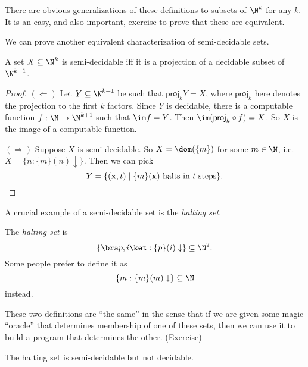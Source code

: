 \documentclass[a4paper]{article}
\newcommand\proj{\mathsf{proj}}
\begin{document}
There are obvious generalizations of these definitions to subsets of $\N^k$ for any $k$. It is an easy, and also important, exercise to prove that these are equivalent.

We can prove another equivalent characterization of semi-decidable sets.
\begin{prop}
  A set $X \subseteq \N^k$ is semi-decidable iff it is a projection of a decidable subset of $\N^{k + 1}$.
\end{prop}

\begin{proof}
  $(\Leftarrow)$ Let $Y \subseteq \N^{k + 1}$ be such that $\proj_k Y = X$, where $\proj_k$ here denotes the projection to the first $k$ factors. Since $Y$ is decidable, there is a computable function $f: \N \to \N^{k + 1}$ such that $\im f = Y$. Then $\im (\proj_k \circ f) = X$. So $X$ is the image of a computable function.

  $(\Rightarrow)$ Suppose $X$ is semi-decidable. So $X = \dom(\{m\})$ for some $m \in \N$, i.e.\ $X = \{n: \{m\}(n) \downarrow\}$. Then we can pick
  \[
    Y = \{(\mathbf{x}, t) \mid \{m\}(\mathbf{x})\text{ halts in $t$ steps}\}.\qedhere
  \]
\end{proof}

A crucial example of a semi-decidable set is the \emph{halting set}.
\begin{defi}
  The \emph{halting set} is
  \[
    \{\bra p, i\ket : \{p\}(i) \downarrow \} \subseteq \N^2.
  \]
  Some people prefer to define it as
  \[
    \{m: \{m\}(m) \downarrow\} \subseteq \N
  \]
  instead.
\end{defi}
These two definitions are ``the same'' in the sense that if we are given some magic ``oracle'' that determines membership of one of these sets, then we can use it to build a program that determines the other. (Exercise)

\begin{thm}[Turing]
  The halting set is semi-decidable but not decidable.
\end{thm}
\end{document}
